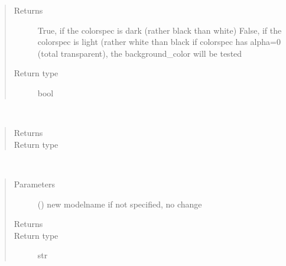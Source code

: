 \documentclass[letterpaper,10pt,english]{sphinxmanual}
\begin{document}
\begin{fulllineitems}
\begin{fulllineitems}
\begin{quote}
\begin{description}
\item[{Returns}] \leavevmode
True, if the colorspec is dark (rather black than white) 
False, if the colorspec is light (rather white than black 
if colorspec has alpha=0 (total transparent), the background\_color will be tested

\item[{Return type}] \leavevmode
bool

\end{description}\end{quote}

\end{fulllineitems}


\begin{fulllineitems}
\label{\detokenize{Reference:salabim.Environment.main}}~\begin{quote}\begin{description}
\item[{Returns}] \leavevmode
{}

\item[{Return type}] \leavevmode
{\hyperref[\detokenize{Reference:salabim.Component}]{}}

\end{description}\end{quote}

\end{fulllineitems}


\begin{fulllineitems}
\label{\detokenize{Reference:salabim.Environment.modelname}}~\begin{quote}\begin{description}
\item[{Parameters}] \leavevmode
{} () \textendash{} new modelname 
if not specified, no change

\item[{Returns}] \leavevmode
{}

\item[{Return type}] \leavevmode
str

\end{description}\end{quote}


\end{fulllineitems}
\end{fulllineitems}
\end{document}
